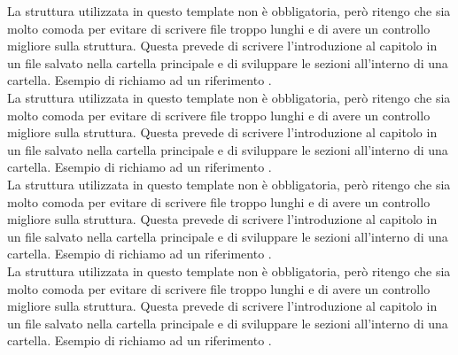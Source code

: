 \noindent
La struttura utilizzata in questo template non è obbligatoria, però ritengo che sia molto comoda per evitare di scrivere file troppo lunghi e di avere un controllo migliore sulla struttura. Questa prevede di scrivere l'introduzione al capitolo in un file salvato nella cartella principale e di sviluppare le sezioni all'interno di una cartella. Esempio di richiamo ad un riferimento \cite{Latex-impara-latex}.\\

\noindent
La struttura utilizzata in questo template non è obbligatoria, però ritengo che sia molto comoda per evitare di scrivere file troppo lunghi e di avere un controllo migliore sulla struttura. Questa prevede di scrivere l'introduzione al capitolo in un file salvato nella cartella principale e di sviluppare le sezioni all'interno di una cartella. Esempio di richiamo ad un riferimento \cite{Latex-impara-latex}.\\

\noindent
La struttura utilizzata in questo template non è obbligatoria, però ritengo che sia molto comoda per evitare di scrivere file troppo lunghi e di avere un controllo migliore sulla struttura. Questa prevede di scrivere l'introduzione al capitolo in un file salvato nella cartella principale e di sviluppare le sezioni all'interno di una cartella. Esempio di richiamo ad un riferimento \cite{Latex-impara-latex}.\\

\noindent
La struttura utilizzata in questo template non è obbligatoria, però ritengo che sia molto comoda per evitare di scrivere file troppo lunghi e di avere un controllo migliore sulla struttura. Questa prevede di scrivere l'introduzione al capitolo in un file salvato nella cartella principale e di sviluppare le sezioni all'interno di una cartella. Esempio di richiamo ad un riferimento \cite{Latex-impara-latex}.\\